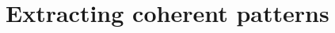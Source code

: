 \documentclass[aspectratio=169, usenames, dvipsnames]{beamer}
\begin{document}
%
%
%
%
%
%
%
%
%
%
%
%

\section{Extracting coherent patterns}
\begin{frame}
  \sectionpage
\end{frame}
\end{document}
